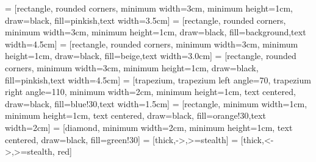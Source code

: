 \usepackage{graphicx}
\usepackage{hyperref, url}
\hypersetup{colorlinks,citecolor=myorange,filecolor=red,linkcolor=brown,urlcolor=blue}

\usepackage{subfig}
\usepackage{tikz}
\usetikzlibrary{shapes.geometric, arrows,shapes.symbols,decorations.pathreplacing}
 = [rectangle, rounded corners, minimum width=3cm, minimum height=1cm, draw=black, fill=pinkish,text width=3.5cm]
 = [rectangle, rounded corners, minimum width=3cm, minimum height=1cm, draw=black, fill=background,text width=4.5cm]
 = [rectangle, rounded corners, minimum width=3cm, minimum height=1cm, draw=black, fill=beige,text width=3.0cm]
 = [rectangle, rounded corners, minimum width=3cm, minimum height=1cm, draw=black, fill=pinkish,text width=4.5cm]
 = [trapezium, trapezium left angle=70, trapezium right angle=110, minimum width=2cm, minimum height=1cm, text centered, draw=black, fill=blue!30,text width=1.5cm]
 = [rectangle, minimum width=1cm, minimum height=1cm, text centered, draw=black, fill=orange!30,text width=2cm]
 = [diamond, minimum width=2cm, minimum height=1cm, text centered, draw=black, fill=green!30]
 = [thick,->,>=stealth]
 = [thick,<->,>=stealth, red]







\usepackage{color, colortbl,xcolor}

\newcommand{\code}[1]{\texttt{#1}}


\usepackage{comment}

\makeatletter

\def \iqsssectiontitleheader {}

\newcommand{\iqsssectiontitle}[1]{
	\def \iqsssectiontitleheader{#1}
}

